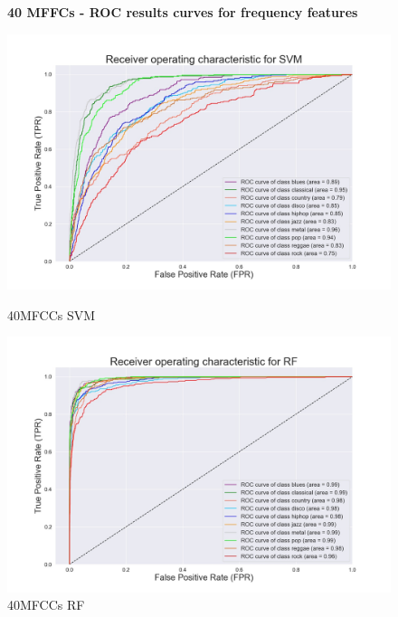 \documentclass[conference]{IEEEtran}
\begin{document}
\begin{figure}[!ht]
    \begin{center}
        \small\textbf{40 MFFCs - ROC results curves for frequency features}\par\medskip    
        \begin{minipage}[t]{.24\textwidth}
            \centering
            \includegraphics[width=\textwidth]{plot/SL/frequency_features/40/SVM_40MFCC_10000_10GEN_GTZAN - ROC Plot.jpg}
            \caption{40MFCCs SVM}
            \label{fig:40MFCCs SVM Frequency Features}
        \end{minipage}
        \begin{minipage}[t]{.24\textwidth}
            \centering
            \includegraphics[width=\textwidth]{plot/SL/frequency_features/40/RF_40MFCC_10000_10GEN_GTZAN - ROC Plot.jpg}
            \caption{40MFCCs RF}
            \label{fig:40MFCCs RF Frequency Features}

\end{minipage}
\end{center}
\end{figure}
\end{document}
